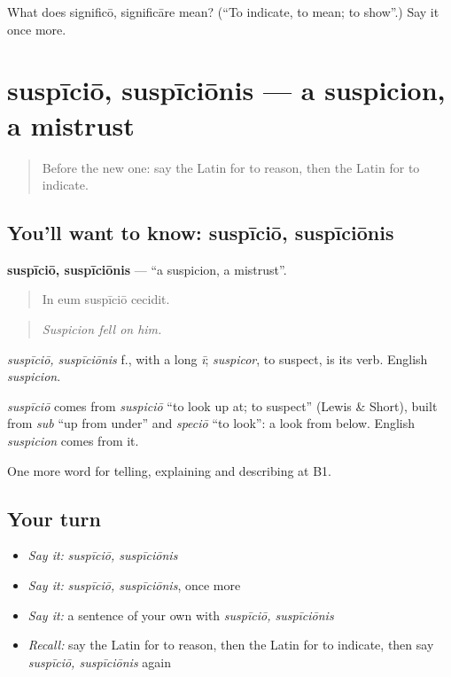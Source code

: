 \begin{tcolorbox}[breakable,colback=teal!4,colframe=teal!35!black,title={Before you move on}]
What does significō, significāre mean? (\textquotedblleft{}To indicate, to mean; to show\textquotedblright{}.) Say it once more.
\end{tcolorbox}
\section[suspīciō, suspīciōnis]{suspīciō, suspīciōnis — a suspicion, a mistrust}

\label{lesson:LA-C364-suspicio}



\begin{quote}
Before the new one: say the Latin for to reason, then the Latin for to indicate.
\end{quote}

\subsection*{You'll want to know: suspīciō, suspīciōnis}
\textbf{suspīciō, suspīciōnis} — \textquotedblleft{}a suspicion, a mistrust\textquotedblright{}.

\begin{quote}
In eum suspīciō cecidit.
\end{quote}

\begin{quote}
\emph{Suspicion fell on him.}
\end{quote}

\emph{suspīciō, suspīciōnis} f., with a long \emph{ī}; \emph{suspicor}, to suspect, is its verb. English \emph{suspicion}.

\begin{cousinweb}
\emph{suspīciō} comes from \emph{suspiciō} \textquotedblleft{}to look up at; to suspect\textquotedblright{} (Lewis \& Short), built from \emph{sub} \textquotedblleft{}up from under\textquotedblright{} and \emph{speciō} \textquotedblleft{}to look\textquotedblright{}: a look from below. English \emph{suspicion} comes from it.
\end{cousinweb}

\begin{grammarlens}[title={What you've built}]
One more word for telling, explaining and describing at B1.
\end{grammarlens}

\subsection*{Your turn}
\begin{itemize}
\raggedright
  \item \emph{Say it:} \emph{suspīciō, suspīciōnis}
  \item \emph{Say it:} \emph{suspīciō, suspīciōnis}, once more
  \item \emph{Say it:} a sentence of your own with \emph{suspīciō, suspīciōnis}
  \item \emph{Recall:} say the Latin for to reason, then the Latin for to indicate, then say \emph{suspīciō, suspīciōnis} again
\end{itemize}

